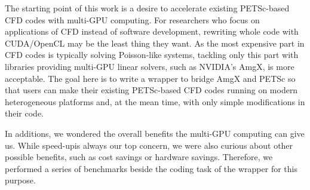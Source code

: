 The starting point of this work is a desire to accelerate existing 
PETSc\cite{petsc-web-page}-based CFD codes with multi-GPU computing.
For researchers who focus on applications of CFD instead of software development,
rewriting whole code with CUDA/OpenCL may be the least thing they want.
As the most expensive part in CFD codes is typically solving Poisson-like systems,
tackling only this part with libraries providing multi-GPU linear solvers, 
such as NVIDIA's AmgX\cite{amgx-web-page}, is more acceptable.
The goal here is to write a wrapper to bridge AmgX and PETSc so that users can 
make their existing PETSc-based CFD codes running on modern heterogeneous platforms
and, at the mean time, with only simple modifications in their code.

In additions, we wondered the overall benefits the multi-GPU computing can give us.
While speed-up\footnotemark is always our top concern, we were also curious 
about other possible benefits, such as cost savings or hardware savings.
Therefore, we performed a series of benchmarks beside the coding task of the 
wrapper for this purpose.

